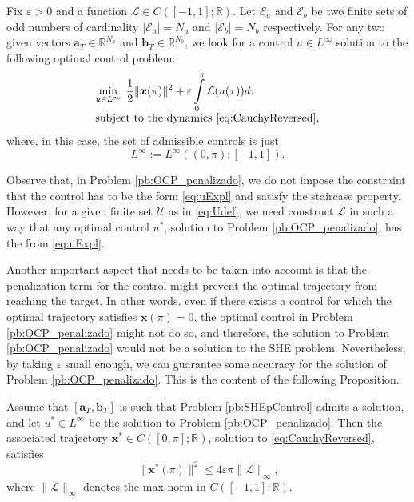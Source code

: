 \documentclass[twocolumn]{autart}    %
\begin{document}
\bigskip

\begin{problem}\label{pb:OCP_penalizado}
Fix $\varepsilon>0$ and a function $\mathcal{L}\in C([-1,1];\mathbb{R})$.  Let $\mathcal{E} _a $ and $\mathcal{E} _b $ be two finite sets of odd numbers of cardinality $|\mathcal{E}_a| = N_a $ and $ |\mathcal{E} _b| = N_b$ respectively.
    For any two given vectors 
    $\bm{a}_T \in \mathbb{R}^{N_a}$ and $\bm{b}_T \in \mathbb{R}^{N_b} $,  
    we look for a control $u\in L^\infty$ solution to the following optimal control problem:
\begin{equation*}
\begin{array}{l}
	\displaystyle\min_{u \in L^\infty}\;\dfrac{1}{2} \|\bm{x}(\pi)\|^2 + \varepsilon \displaystyle\int_0^\pi \mathcal{L}(u(\tau)) d\tau \\ 
	\text{subject to the dynamics \eqref{eq:CauchyReversed}},
\end{array}
    \end{equation*}
    where, in this case, the set of admissible controls is just 
    $$L^\infty:=L^\infty ((0,\pi); [-1,1]).$$
\end{problem}

Observe that, in Problem \ref{pb:OCP_penalizado}, we do not impose the constraint that the control has to be the form \eqref{eq:uExpl} and satisfy the staircase property.
However,  for a given finite set $\mathcal{U}$ as in \eqref{eq:Udef}, we need construct $\mathcal{L}$ in such a way that any optimal control $u^\ast$, solution to Problem \ref{pb:OCP_penalizado}, has the from \eqref{eq:uExpl}.

Another important aspect that needs to be taken into account is that the penalization term for the control might prevent the optimal trajectory from reaching the target. 
In other words, even if there exists a control for which the optimal trajectory satisfies $\bm{x} (\pi) = 0$, the optimal control in Problem \ref{pb:OCP_penalizado} might not do so, and therefore, the solution to Problem \ref{pb:OCP_penalizado} would not be a solution to the SHE problem.
Nevertheless, by taking $\varepsilon$ small enough, we can guarantee some accuracy for the solution of Problem \ref{pb:OCP_penalizado}.
This is the content of the following Proposition.

\bigskip

\begin{proposition}\label{Prop:approx controllability}
Assume that $[\bm{a}_T,\bm{b}_T]$ is such that Problem \ref{pb:SHEpControl} admits a solution, and let $u^\ast\in L^\infty$ be the solution to Problem \ref{pb:OCP_penalizado}.
Then the associated trajectory $\bm{x}^\ast\in C([0,\pi];\mathbb{R})$, solution to \eqref{eq:CauchyReversed}, satisfies
$$
\| \bm{x}^\ast (\pi)  \|^2 \leq  4 \varepsilon \pi \| \mathcal{L}\|_\infty,
$$
where $\| \mathcal{L}\|_\infty$ denotes the max-norm in $C([-1,1]; \mathbb{R})$.
\end{proposition}
\end{document}
